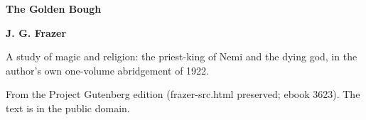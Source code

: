 \documentclass[11pt,letterpaper]{article}
\begin{document}
\color{ink}

\begin{titlepage}
\centering
\vspace*{4em}
{\LARGE\bfseries\color{heading} The Golden Bough\par}
\vspace{2em}
{\Large\bfseries\color{heading} J. G. Frazer\par}
\vspace{2.5em}
{\itshape\color{subhead}\parbox{0.8\linewidth}{\centering A study of magic and religion: the priest-king of Nemi and the dying god, in the author's own one-volume abridgement of 1922.\par}}
\vfill
{\small From the Project Gutenberg edition (frazer-src.html preserved; ebook 3623). The text is in the public domain.\par}
\vspace{2em}
\end{titlepage}

\tableofcontents


\end{document}
